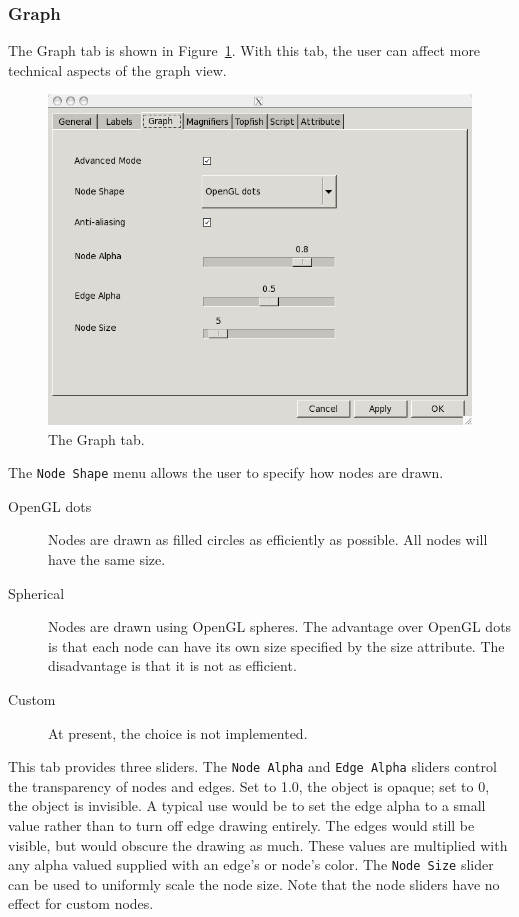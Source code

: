 \subsubsection{Graph}
The Graph tab is shown in Figure~\ref{fig:graph}.
With this tab, the user can affect more technical aspects of the graph view.
\begin{figure}[ht]
\begin{center}
\includegraphics[scale=.5]{figures/graph.png}
\caption{\small The Graph tab.}
\label{fig:graph}
\end{center}
\end{figure}
The {\tt Node Shape} menu allows the user to specify how nodes are drawn.
\begin{description}
\item[OpenGL dots] Nodes are drawn as filled circles as efficiently as possible. All nodes
will have the same size.
\item[Spherical] Nodes are drawn using OpenGL spheres. The advantage over OpenGL dots is that
each node can have its own size specified by the size attribute. The disadvantage is that it is not
as efficient.
\item[Custom] At present, the choice is not implemented.
\end{description}

This tab provides three sliders. The {\tt Node Alpha} and {\tt Edge Alpha} 
sliders control the transparency of nodes and edges. Set to 1.0, the object is opaque;
set to 0, the object is invisible. A typical use would be to set the edge alpha to a small
value rather than to turn off edge drawing entirely. The edges would still be visible, but
would obscure the drawing as much. 
These values are multiplied with any alpha valued supplied with an edge's or node's color.
The {\tt Node Size} slider can be used to uniformly
scale the node size. Note that the node sliders have no effect for custom nodes.

